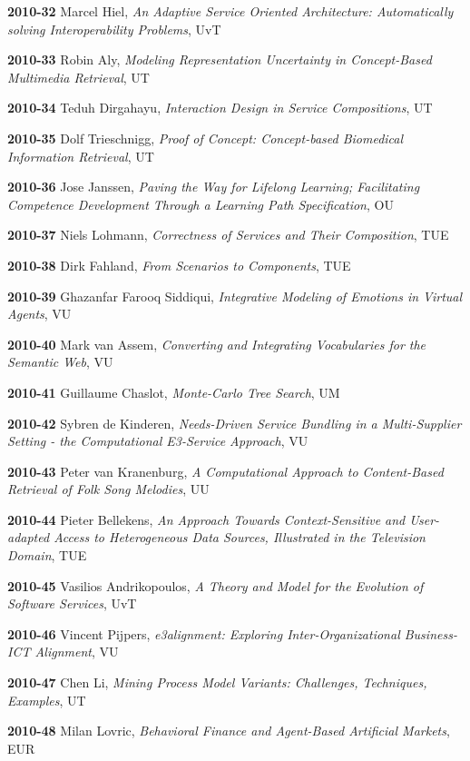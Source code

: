 \begin{multicols}{2}
\textbf{2010-32}   Marcel Hiel, \textit{An Adaptive Service Oriented Architecture: Automatically solving Interoperability Problems}, UvT

\textbf{2010-33}   Robin Aly, \textit{Modeling Representation Uncertainty in Concept-Based Multimedia Retrieval}, UT

\textbf{2010-34}   Teduh Dirgahayu, \textit{Interaction Design in Service Compositions}, UT

\textbf{2010-35}   Dolf Trieschnigg, \textit{Proof of Concept: Concept-based Biomedical Information Retrieval}, UT

\textbf{2010-36}   Jose Janssen, \textit{Paving the Way for Lifelong Learning; Facilitating Competence Development Through a Learning Path Specification}, OU

\textbf{2010-37}   Niels Lohmann, \textit{Correctness of Services and Their Composition}, TUE

\textbf{2010-38}   Dirk Fahland, \textit{From Scenarios to Components}, TUE

\textbf{2010-39}   Ghazanfar Farooq Siddiqui, \textit{Integrative Modeling of Emotions in Virtual Agents}, VU

\textbf{2010-40}   Mark van Assem, \textit{Converting and Integrating Vocabularies for the Semantic Web}, VU

\textbf{2010-41}   Guillaume Chaslot, \textit{Monte-Carlo Tree Search}, UM

\textbf{2010-42}   Sybren de Kinderen, \textit{Needs-Driven Service Bundling in a Multi-Supplier Setting - the Computational E3-Service Approach}, VU

\textbf{2010-43}   Peter van Kranenburg, \textit{A Computational Approach to Content-Based Retrieval of Folk Song Melodies}, UU

\textbf{2010-44}   Pieter Bellekens, \textit{An Approach Towards Context-Sensitive and User-adapted Access to Heterogeneous Data Sources, Illustrated in the Television Domain}, TUE

\textbf{2010-45}   Vasilios Andrikopoulos, \textit{A Theory and Model for the Evolution of Software Services}, UvT

\textbf{2010-46}   Vincent Pijpers, \textit{ e3alignment: Exploring Inter-Organizational Business-ICT Alignment}, VU

\textbf{2010-47}   Chen Li, \textit{Mining Process Model Variants: Challenges, Techniques, Examples}, UT

\textbf{2010-48}   Milan Lovric, \textit{Behavioral Finance and Agent-Based Artificial Markets}, EUR


\end{multicols}
